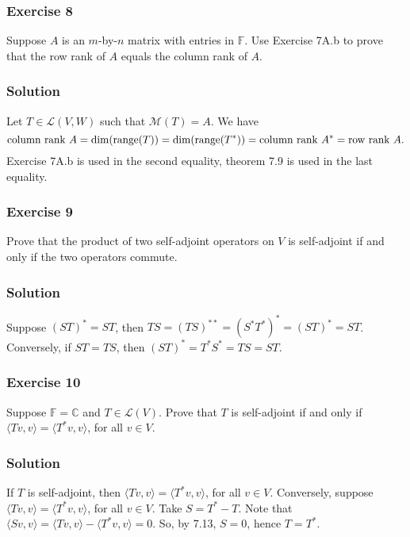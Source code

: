 \subsubsection*{Exercise 8}

Suppose $A$ is an $m$-by-$n$ matrix with entries in $\mathbb{F}$.
Use Exercise 7A.b to prove that the row rank of $A$ equals the column rank of $A$.

\subsubsection*{Solution}

Let $T \in \mathcal{L}(V, W)$ such that $\mathcal{M}(T) = A$.
We have
\begin{equation*}
    \text{column rank } A
        = \dim(\mathrm{range}(T))
        = \dim(\mathrm{range}(T^*))
        = \text{column rank } A^*
        = \text{row rank } A.
\end{equation*}
Exercise 7A.b is used in the second equality, theorem 7.9 is used in the last equality.


\subsubsection*{Exercise 9}

Prove that the product of two self-adjoint operators on $V$ is self-adjoint if and only if the two operators commute.

\subsubsection*{Solution}

Suppose $(ST)^* = ST$, then $TS = (TS)^{**} = (S^*T^*)^* = (ST)^* = ST$.
Conversely, if $ST = TS$, then $(ST)^* = T^*S^* = TS = ST$.


\subsubsection*{Exercise 10}

Suppose $\mathbb{F} = \mathbb{C}$ and $T \in \mathcal{L}(V)$.
Prove that $T$ is self-adjoint if and only if $\langle Tv, v \rangle = \langle T^*v, v \rangle$, for all $v \in V$.

\subsubsection*{Solution}

If $T$ is self-adjoint, then $\langle Tv, v \rangle = \langle T^*v, v \rangle$, for all $v \in V$.
Conversely, suppose $\langle Tv, v \rangle = \langle T^*v, v \rangle$, for all $v \in V$.
Take $S = T^* - T$.
Note that $\langle Sv, v \rangle = \langle Tv, v \rangle - \langle T^*v, v\rangle = 0$.
So, by 7.13, $S = 0$, hence $T = T^*$.
